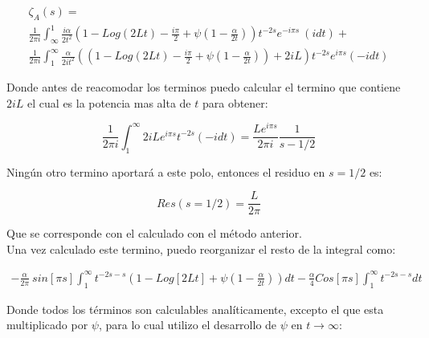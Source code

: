\begin{equation}
\begin{array}{c}
    \zeta _A (s) = \\
     \frac{1}{2 \pi i} \int _{\infty} ^{1}
     \frac{i \alpha}{2 t^2}
     \left(
     1 - Log(2 L t) - \frac{i \pi}{2} + \psi (1-\frac{\alpha}{2 t})
     \right)
     t^{-2 s}
     e^{-i \pi s} \ 
     (i dt) + \\
     \frac{1}{2 \pi i} \int _1 ^{\infty}
     \frac{ \alpha}{2 i t^2}
     \left(
     \left(
     1 - Log(2 L t) - \frac{i \pi}{2} + \psi (1-\frac{\alpha}{2 t}) 
     \right)
     + 2 i L
     \right)
     t^{-2 s}
     e^{i \pi s}
     (-i dt)
     
\end{array}
\end{equation}

Donde antes de reacomodar los terminos puedo calcular el termino que contiene $2iL$ el cual es la potencia mas alta de $t$ para obtener: 

\begin{equation}
    \frac{1}{2 \pi i }
    \int _1 ^{\infty}
    2 i L
    e^{i \pi s}
    t ^{-2 s}
    (-i dt) =  
    \frac{L e^{i \pi s} }{2 \pi i} \frac{1}{s-1/2   }
\end{equation}

Ningún otro termino aportará a este polo, entonces el residuo en $s= 1/2$ es:

\begin{equation}
    Res (s=1/2) = \frac{L}{2 \pi}
\end{equation}

Que se corresponde con el calculado con el método anterior. \\

Una vez calculado este termino, puedo reorganizar el resto de la integral como:

\begin{equation}
\begin{array}{c}
    - \frac{\alpha}{2 \pi} \ sin[\pi s]
    \int _1 ^{\infty}
    t ^{-2 s-s} 
    \left(
    1 - Log[2Lt] + \psi (1- \frac{\alpha}{2t})
    \right) dt - 
    \frac{\alpha}{4} 
    Cos[\pi s]
    \int _1 ^{\infty} t^{-2s-s} dt
\end{array}
\end{equation}

Donde todos los términos son calculables analíticamente, excepto el que esta multiplicado por $\psi$, para lo cual utilizo el desarrollo de $\psi$ en $t \rightarrow \infty$:

